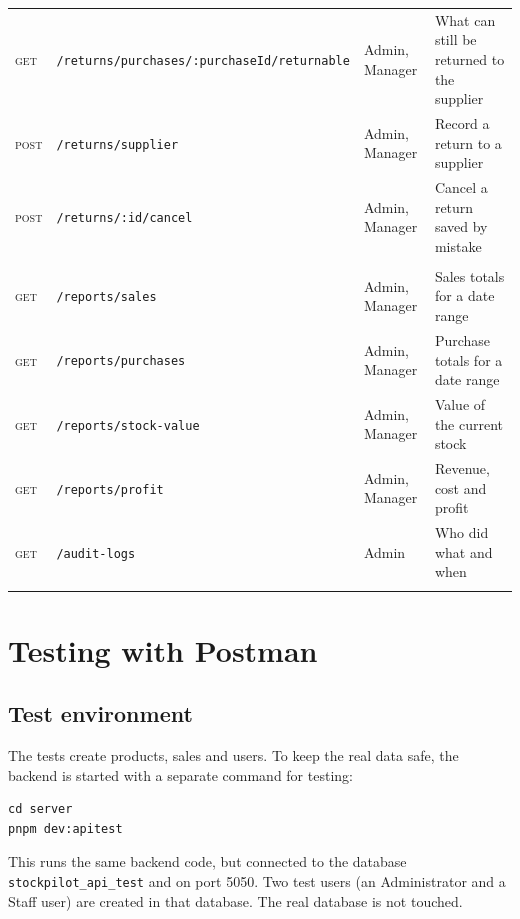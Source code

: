 \documentclass[11pt,a4paper]{article}
\newcommand{\code}[1]{\texttt{#1}}
\begin{document}
\begin{longtable}{@{}P{1.45cm}P{5.1cm}P{2.5cm}P{5.25cm}@{}}
\textsc{get} & \code{/\allowbreak{}returns/\allowbreak{}purchases/\allowbreak{}:purchaseId/\allowbreak{}returnable} & Admin, Manager & What can still be returned to the supplier \\
\textsc{post} & \code{/\allowbreak{}returns/\allowbreak{}supplier} & Admin, Manager & Record a return to a supplier \\
\textsc{post} & \code{/\allowbreak{}returns/\allowbreak{}:id/\allowbreak{}cancel} & Admin, Manager & Cancel a return saved by mistake \\
\addlinespace
{} \\
\textsc{get} & \code{/\allowbreak{}reports/\allowbreak{}sales} & Admin, Manager & Sales totals for a date range \\
\textsc{get} & \code{/\allowbreak{}reports/\allowbreak{}purchases} & Admin, Manager & Purchase totals for a date range \\
\textsc{get} & \code{/\allowbreak{}reports/\allowbreak{}stock-value} & Admin, Manager & Value of the current stock \\
\textsc{get} & \code{/\allowbreak{}reports/\allowbreak{}profit} & Admin, Manager & Revenue, cost and profit \\
\textsc{get} & \code{/\allowbreak{}audit-logs} & Admin & Who did what and when \\
\addlinespace
\bottomrule
\end{longtable}

\section{Testing with Postman}
\subsection{Test environment}
The tests create products, sales and users. To keep the real data safe, the backend is started with a separate command for testing:
\begin{lstlisting}[style=query]
cd server
pnpm dev:apitest
\end{lstlisting}
This runs the same backend code, but connected to the database \code{stockpilot\_api\_test} and on port 5050. Two test users (an Administrator and a Staff user) are created in that database. The real database is not touched.
\end{document}
